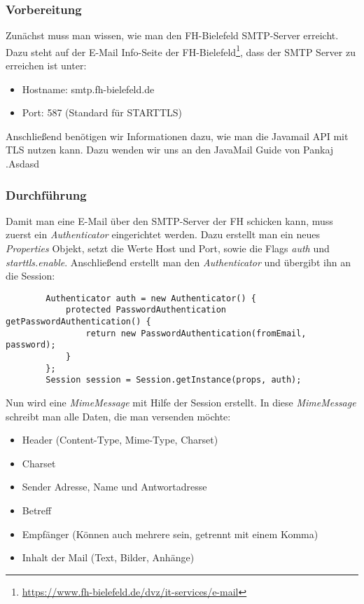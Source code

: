 		\subsubsection{\textbf{Vorbereitung}}
		Zunächst muss man wissen, wie man den FH-Bielefeld SMTP-Server erreicht. Dazu steht auf der E-Mail Info-Seite der FH-Bielefeld\footnote{\url{https://www.fh-bielefeld.de/dvz/it-services/e-mail}}, dass der SMTP Server zu erreichen ist unter:
		\begin{itemize}
		\item Hostname: smtp.fh-bielefeld.de
		\item Port: 587 (Standard für STARTTLS)
		\end{itemize}
		Anschließend benötigen wir Informationen dazu, wie man die Javamail API mit TLS nutzen kann. Dazu wenden wir uns an den JavaMail Guide von Pankaj \cite{mailWithJavamail}.Asdasd
		\subsubsection{\textbf{Durchführung}}
		Damit man eine E-Mail über den SMTP-Server der FH schicken kann, muss zuerst ein \textit{Authenticator} eingerichtet werden. Dazu erstellt man ein neues \textit{Properties} Objekt, setzt die Werte Host und Port, sowie die Flags \textit{auth} und \textit{starttls.enable}. Anschließend erstellt man den \textit{Authenticator} und übergibt ihn an die Session:
		\begin{verbatim}
		Authenticator auth = new Authenticator() {
			protected PasswordAuthentication getPasswordAuthentication() {
				return new PasswordAuthentication(fromEmail, password);
			}
		};
		Session session = Session.getInstance(props, auth);
		\end{verbatim}
		
		Nun wird eine \textit{MimeMessage} mit Hilfe der Session erstellt. In diese \textit{MimeMessage} schreibt man alle Daten, die man versenden möchte:
		\begin{itemize}
		\item Header (Content-Type, Mime-Type, Charset)
		\item Charset
		\item Sender Adresse, Name und Antwortadresse
		\item Betreff
		\item Empfänger (Können auch mehrere sein, getrennt mit einem Komma)
		\item Inhalt der Mail (Text, Bilder, Anhänge)
		\end{itemize}
		
